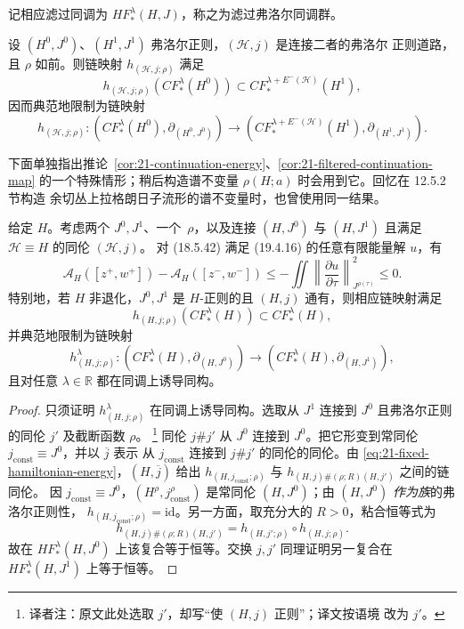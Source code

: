 记相应滤过同调为 $HF_*^\lambda(H,J)$，称之为滤过弗洛尔同调群。

\begin{corollary}
\label{cor:21-filtered-continuation-map}
设 $(H^0,J^0)$、$(H^1,J^1)$ 弗洛尔正则，$(\mathcal H,j)$ 是连接二者的弗洛尔
正则道路，且 $\rho$ 如前。则链映射 $h_{(\mathcal H,j;\rho)}$ 满足
\[
 h_{(\mathcal H,j;\rho)}(CF_*^\lambda(H^0))
 \subset CF_*^{\lambda+E^-(\mathcal H)}(H^1),
\]
因而典范地限制为链映射
\[
 h_{(\mathcal H,j;\rho)}:
 (CF_*^\lambda(H^0),\partial_{(H^0,J^0)})\longrightarrow
 (CF_*^{\lambda+E^-(\mathcal H)}(H^1),\partial_{(H^1,J^1)}).
\]
\end{corollary}

下面单独指出推论~\ref{cor:21-continuation-energy}、\ref{cor:21-filtered-continuation-map}
的一个特殊情形；稍后构造谱不变量 $\rho(H;a)$ 时会用到它。回忆在 12.5.2 节构造
余切丛上拉格朗日子流形的谱不变量时，也曾使用同一结果。

\begin{corollary}
\label{cor:21-change-almost-complex-structure}
给定 $H$。考虑两个 $J^0,J^1$、一个\termElongationFunction{}~$\rho$，以及连接
$(H,J^0)$ 与 $(H,J^1)$ 且满足 $\mathcal H\equiv H$ 的同伦 $(\mathcal H,j)$。
对 (18.5.42) 满足 (19.4.16) 的任意有限能量解 $u$，有
\begin{equation}
 \mathcal A_H([z^+,w^+])-\mathcal A_H([z^-,w^-])
 \leq-\iint\left\lVert\frac{\partial u}{\partial\tau}\right\rVert_{J^{\rho(\tau)}}^2
 \leq0.
 \label{eq:21-fixed-hamiltonian-energy}
\end{equation}
特别地，若 $H$ 非退化，$J^0,J^1$ 是 $H$-正则的且 $(H,j)$ 通有，则相应链映射满足
\[
 h_{(H,j;\rho)}(CF_*^\lambda(H))\subset CF_*^\lambda(H),
\]
并典范地限制为链映射
\[
 h^\lambda_{(H,j;\rho)}:
 (CF_*^\lambda(H),\partial_{(H,J^0)})\longrightarrow
 (CF_*^\lambda(H),\partial_{(H,J^1)}),
\]
且对任意 $\lambda\in\mathbb R$ 都在同调上诱导同构。
\end{corollary}

\begin{proof}
只须证明 $h^\lambda_{(H,j;\rho)}$ 在同调上诱导同构。选取从 $J^1$ 连接到 $J^0$
且弗洛尔正则的同伦 $j'$ 及截断函数 $\rho$。
\footnote{译者注：原文此处选取 $j'$，却写“使 $(H,j)$ \personFloer{}正则”；译文按语境
改为 $j'$。}
同伦 $j\#j'$ 从 $J^0$ 连接到
$J^0$。把它形变到常同伦 $j_{\mathrm{const}}\equiv J^0$，并以 $\overline j$ 表示
从 $j_{\mathrm{const}}$ 连接到 $j\#j'$ 的同伦的同伦。由
\eqref{eq:21-fixed-hamiltonian-energy}，$(H,\overline j)$ 给出
$h_{(H,j_{\mathrm{const}};\rho)}$ 与 $h_{(H,j)\#(\rho;R)(H,j')}$ 之间的链同伦。
因 $j_{\mathrm{const}}\equiv J^0$，$(H^\rho,j_{\mathrm{const}}^\rho)$ 是常同伦
$(H,J^0)$；由 $(H,J^0)$ \emph{作为族}的弗洛尔正则性，
$h_{(H,j_{\mathrm{const}};\rho)}=\mathrm{id}$。另一方面，取充分大的 $R>0$，粘合恒等式为
\[
 h_{(H,j)\#(\rho;R)(H,j')}=h_{(H,j';\rho)}\circ h_{(H,j;\rho)}.
\]
故在 $HF_*^\lambda(H,J^0)$ 上该复合等于恒等。交换 $j,j'$ 同理证明另一复合在
$HF_*^\lambda(H,J^1)$ 上等于恒等。
\end{proof}

